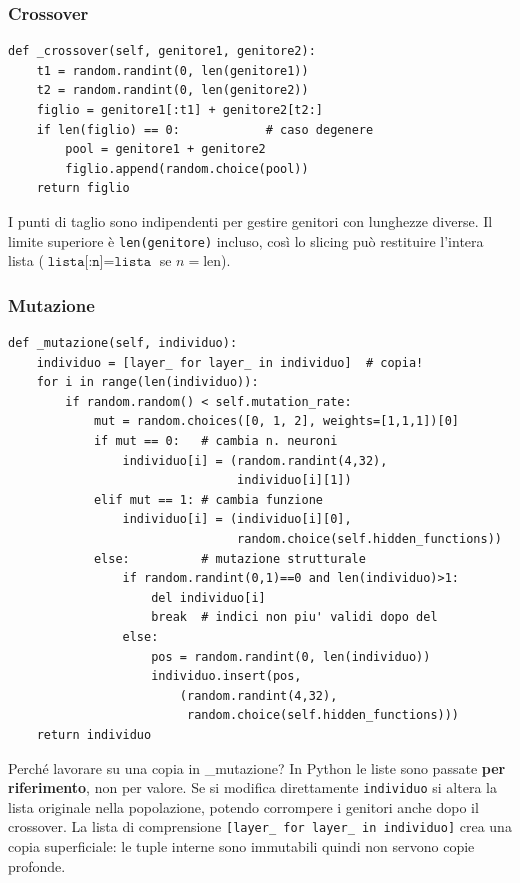 \documentclass[12pt, a4paper]{article}
\begin{document}
\subsubsection{Crossover}

\begin{lstlisting}[caption={Crossover a doppio punto di taglio}]
def _crossover(self, genitore1, genitore2):
    t1 = random.randint(0, len(genitore1))
    t2 = random.randint(0, len(genitore2))
    figlio = genitore1[:t1] + genitore2[t2:]
    if len(figlio) == 0:            # caso degenere
        pool = genitore1 + genitore2
        figlio.append(random.choice(pool))
    return figlio
\end{lstlisting}

I punti di taglio sono indipendenti per gestire genitori con lunghezze diverse.
Il limite superiore è \texttt{len(genitore)} incluso, così lo slicing
può restituire l'intera lista ($\texttt{lista[:n]} = \texttt{lista}$ se
$n = \text{len}$).

\subsubsection{Mutazione}

\begin{lstlisting}[caption={Mutazione con tre tipi di modifica}]
def _mutazione(self, individuo):
    individuo = [layer_ for layer_ in individuo]  # copia!
    for i in range(len(individuo)):
        if random.random() < self.mutation_rate:
            mut = random.choices([0, 1, 2], weights=[1,1,1])[0]
            if mut == 0:   # cambia n. neuroni
                individuo[i] = (random.randint(4,32),
                                individuo[i][1])
            elif mut == 1: # cambia funzione
                individuo[i] = (individuo[i][0],
                                random.choice(self.hidden_functions))
            else:          # mutazione strutturale
                if random.randint(0,1)==0 and len(individuo)>1:
                    del individuo[i]
                    break  # indici non piu' validi dopo del
                else:
                    pos = random.randint(0, len(individuo))
                    individuo.insert(pos,
                        (random.randint(4,32),
                         random.choice(self.hidden_functions)))
    return individuo
\end{lstlisting}

\begin{concetto}{Perché lavorare su una copia in \_mutazione?}
In Python le liste sono passate \textbf{per riferimento}, non per valore.
Se si modifica direttamente \texttt{individuo} si altera la lista originale
nella popolazione, potendo corrompere i genitori anche dopo il crossover.
La lista di comprensione \texttt{[layer\_ for layer\_ in individuo]} crea
una copia superficiale: le tuple interne sono immutabili quindi non servono
copie profonde.
\end{concetto}
\end{document}
